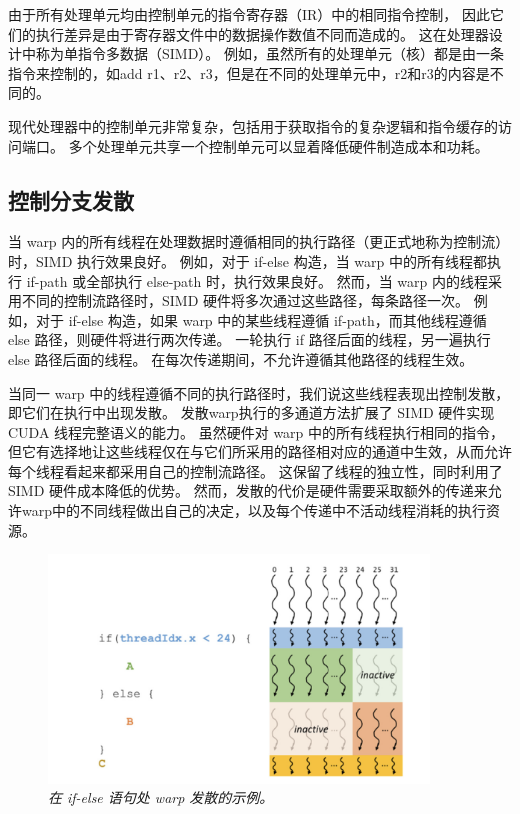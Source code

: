 \begin{remark}[warp与SIMD硬件]
由于所有处理单元均由控制单元的指令寄存器（IR）中的相同指令控制，
因此它们的执行差异是由于寄存器文件中的数据操作数值不同而造成的。 这在处理器设计中称为单指令多数据（SIMD）。 
例如，虽然所有的处理单元（核）都是由一条指令来控制的，如add r1、r2、r3，但是在不同的处理单元中，r2和r3的内容是不同的。

现代处理器中的控制单元非常复杂，包括用于获取指令的复杂逻辑和指令缓存的访问端口。 
多个处理单元共享一个控制单元可以显着降低硬件制造成本和功耗。
\end{remark}

\subsection{控制分支发散}
当 warp 内的所有线程在处理数据时遵循相同的执行路径（更正式地称为控制流）时，SIMD 执行效果良好。 
例如，对于 if-else 构造，当 warp 中的所有线程都执行 if-path 或全部执行 else-path 时，执行效果良好。 
然而，当 warp 内的线程采用不同的控制流路径时，SIMD 硬件将多次通过这些路径，每条路径一次。 
例如，对于 if-else 构造，如果 warp 中的某些线程遵循 if-path，而其他线程遵循 else 路径，则硬件将进行两次传递。 
一轮执行 if 路径后面的线程，另一遍执行 else 路径后面的线程。 在每次传递期间，不允许遵循其他路径的线程生效。

当同一 warp 中的线程遵循不同的执行路径时，我们说这些线程表现出控制发散，即它们在执行中出现发散。 
发散warp执行的多通道方法扩展了 SIMD 硬件实现 CUDA 线程完整语义的能力。 虽然硬件对 warp 中的所有线程执行相同的指令，
但它有选择地让这些线程仅在与它们所采用的路径相对应的通道中生效，从而允许每个线程看起来都采用自己的控制流路径。 
这保留了线程的独立性，同时利用了 SIMD 硬件成本降低的优势。 
然而，发散的代价是硬件需要采取额外的传递来允许warp中的不同线程做出自己的决定，以及每个传递中不活动线程消耗的执行资源。

\begin{figure}[H]
	\centering
	\includegraphics[width=0.9\textwidth]{figs/F4.9.png}
	\caption{\textit{在 if-else 语句处 warp 发散的示例。}}
\end{figure}

